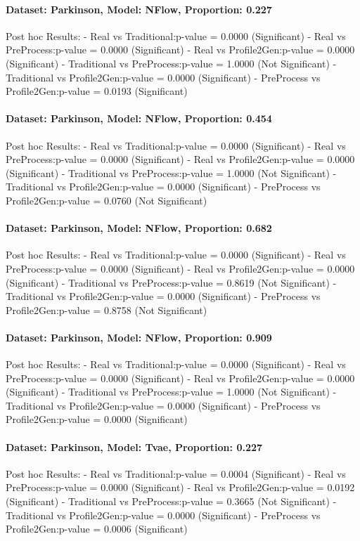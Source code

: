 \documentclass{article}
\theoremstyle{plain}
\theoremstyle{definition}
\theoremstyle{remark}
\begin{document}
\paragraph{Dataset: Parkinson, Model: NFlow, Proportion: 0.227
}Post hoc Results:
- Real vs Traditional:p-value = 0.0000 (Significant)
- Real vs PreProcess:p-value = 0.0000 (Significant)
- Real vs Profile2Gen:p-value = 0.0000 (Significant)
- Traditional vs PreProcess:p-value = 1.0000 (Not Significant)
- Traditional vs Profile2Gen:p-value = 0.0000 (Significant)
- PreProcess vs Profile2Gen:p-value = 0.0193 (Significant)

\paragraph{Dataset: Parkinson, Model: NFlow, Proportion: 0.454
}Post hoc Results:
- Real vs Traditional:p-value = 0.0000 (Significant)
- Real vs PreProcess:p-value = 0.0000 (Significant)
- Real vs Profile2Gen:p-value = 0.0000 (Significant)
- Traditional vs PreProcess:p-value = 1.0000 (Not Significant)
- Traditional vs Profile2Gen:p-value = 0.0000 (Significant)
- PreProcess vs Profile2Gen:p-value = 0.0760 (Not Significant)

\paragraph{Dataset: Parkinson, Model: NFlow, Proportion: 0.682
}Post hoc Results:
- Real vs Traditional:p-value = 0.0000 (Significant)
- Real vs PreProcess:p-value = 0.0000 (Significant)
- Real vs Profile2Gen:p-value = 0.0000 (Significant)
- Traditional vs PreProcess:p-value = 0.8619 (Not Significant)
- Traditional vs Profile2Gen:p-value = 0.0000 (Significant)
- PreProcess vs Profile2Gen:p-value = 0.8758 (Not Significant)

\paragraph{Dataset: Parkinson, Model: NFlow, Proportion: 0.909
}Post hoc Results:
- Real vs Traditional:p-value = 0.0000 (Significant)
- Real vs PreProcess:p-value = 0.0000 (Significant)
- Real vs Profile2Gen:p-value = 0.0000 (Significant)
- Traditional vs PreProcess:p-value = 1.0000 (Not Significant)
- Traditional vs Profile2Gen:p-value = 0.0000 (Significant)
- PreProcess vs Profile2Gen:p-value = 0.0000 (Significant)

\paragraph{Dataset: Parkinson, Model: Tvae, Proportion: 0.227
}Post hoc Results:
- Real vs Traditional:p-value = 0.0004 (Significant)
- Real vs PreProcess:p-value = 0.0000 (Significant)
- Real vs Profile2Gen:p-value = 0.0192 (Significant)
- Traditional vs PreProcess:p-value = 0.3665 (Not Significant)
- Traditional vs Profile2Gen:p-value = 0.0000 (Significant)
- PreProcess vs Profile2Gen:p-value = 0.0006 (Significant)
\end{document}
